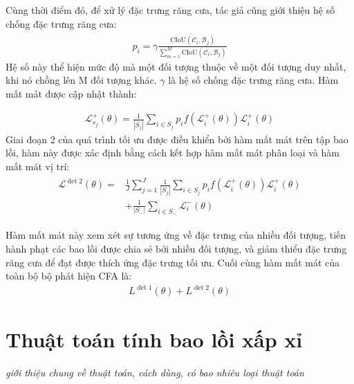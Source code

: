 \documentclass[12pt,a4paper,openany,oneside]{report}
\begin{document}
Cùng thời điểm đó, để xử lý đặc trưng răng cưa, tác giả cũng giới thiệu hệ số chống đặc trưng răng cưa:
\begin{align}\label{FAA_fomular}
	p_i = \gamma\dot{\frac{\mathrm{CIoU}(\mathcal{C}_i, \mathcal{B}_j)}{\sum_{m=1}^{M}\mathrm{CIoU}\left(\mathcal{C}_i, \mathcal{B}_j\right)}}
\end{align}
Hệ số này thể hiện mức độ mà một đối tượng thuộc về một đối tượng duy nhất, khi nó chồng lên M đối tượng khác. $\gamma$ là hệ số chống đặc trưng răng cưa.
Hàm mất mát được cập nhật thành: 

\begin{align}\label{loss_update}
	\mathcal{L}_{s_j}^{+}(\theta)=\frac{1}{\left|S_j\right|} \sum_{i \in S_j} p_i f\left(\mathcal{L}_i^{+}(\theta)\right) \mathcal{L}_i^{+}(\theta)
\end{align}
Giai đoạn 2 của quá trình tối ưu được điều khiển bởi hàm mất mát trên tập bao lồi, hàm này được xác định bằng cách kết hợp hàm mất mát phân loại và hàm mất mát vị trí:
\begin{align} \label{loss_det_2}
	\begin{aligned}
		\mathcal{L}^{\operatorname{det} 2}(\theta)= & \frac{1}{J} \sum_{j=1}^J \frac{1}{\left|S_j\right|} \sum_{i \in S_j} p_i f\left(\mathcal{L}_i^{+}(\theta)\right) \mathcal{L}_i^{+}(\theta) \\
		& +\frac{1}{\left|S_{-}\right|} \sum_{i \in S_{-}} \mathcal{L}_i^{-}(\theta)
	\end{aligned}
\end{align}

Hàm mất mát này xem xét sự tương ứng về đặc trưng của nhiều đối tượng, tiến hành phạt các bao lồi được chia sẻ bởi nhiều đối tượng, và giảm thiểu đặc trưng răng cưa để đạt được thích ứng đặc trưng tối ưu. Cuối cùng hàm mất mát của toàn bộ bộ phát hiện CFA là: 
\begin{align} \label{final_loss_CFA}
	L^{\operatorname{det} 1}(\theta)+L^{\operatorname{det} 2}(\theta)
\end{align}

\chapter{Thuật toán tính bao lồi xấp xỉ}
\textit{giới thiệu chung về thuật toán, cách dùng, có bao nhiêu loại thuật toán}
\end{document}
